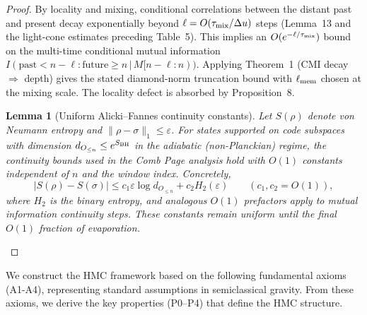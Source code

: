\documentclass[aps,prd,preprint,onecolumn,superscriptaddress,nofootinbib,longbibliography,floatfix,11pt,showpacs,showkeys]{revtex4-2}
\newcommand{\HMC}{\textsc{HMC}\xspace}
\theoremstyle{plain}
\newtheorem{lemma}[theorem]{Lemma}
\theoremstyle{definition}
\theoremstyle{remark}
\begin{document}
\begin{proof}
By locality and mixing, conditional correlations between the distant past and present decay exponentially beyond $\ell=O(\tau_{\rm mix}/\Delta u)$ steps (Lemma~13 and the light-cone estimates preceding Table~5). This implies an $O(e^{-\ell/\tau_{\rm mix}})$ bound on the multi-time conditional mutual information $I(\text{past}{<}n{-}\ell:\text{future}{\ge}n\,|\,M[n{-}\ell{:}n))$. Applying Theorem~1 (CMI decay $\Rightarrow$ depth) gives the stated diamond-norm truncation bound with $\ell_{\rm mem}$ chosen at the mixing scale. The locality defect is absorbed by Proposition~8. 
\begin{lemma}[Uniform Alicki--Fannes continuity constants]\label{lem:af-uniform-constants}
Let $S(\rho)$ denote von Neumann entropy and $\|\rho-\sigma\|_1\le \varepsilon$. For states supported on code subspaces with dimension $d_{O_{\le n}}\le e^{S_{\rm BH}}$ in the adiabatic (non-Planckian) regime, the continuity bounds used in the Comb Page analysis hold with $O(1)$ constants independent of $n$ and the window index. Concretely,
\[
|S(\rho)-S(\sigma)|\le c_1\varepsilon\log d_{O_{\le n}}+c_2 H_2(\varepsilon) \qquad (c_1,c_2=O(1)),
\]
where $H_2$ is the binary entropy, and analogous $O(1)$ prefactors apply to mutual information continuity steps. These constants remain uniform until the final $O(1)$ fraction of evaporation.
\end{lemma}
\end{proof}

We construct the \HMC{} framework based on the following fundamental axioms (A1-A4), representing standard assumptions in semiclassical gravity. From these axioms, we derive the key properties (P0--P4) that define the \HMC{} structure.
\end{document}
